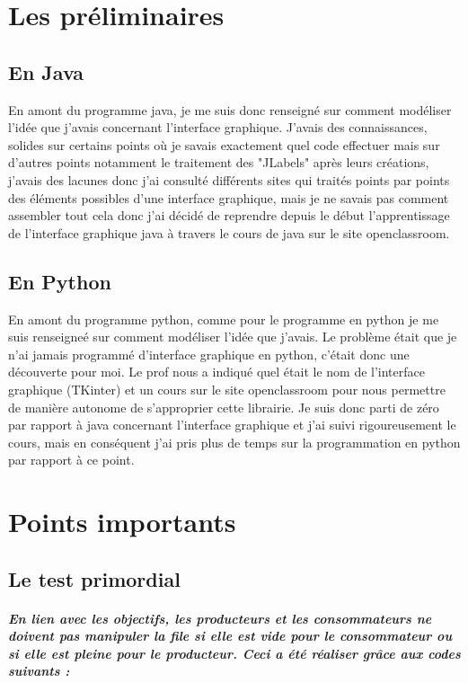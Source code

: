 \documentclass[a4paper]{report}
\begin{document}


\chapter{Les préliminaires}

\section{En Java}

En amont du programme java, je me suis donc renseigné sur comment modéliser l'idée que j'avais concernant l'interface graphique. J'avais des connaissances, solides sur certains points où je savais exactement quel code effectuer mais sur d'autres points notamment le traitement des "JLabels" après leurs créations, j'avais des lacunes donc j'ai consulté différents sites qui traités points par points des éléments possibles d'une interface graphique, mais je ne savais pas comment assembler tout cela donc j'ai décidé de reprendre depuis le début l'apprentissage de l'interface graphique java à travers le cours de java sur le site openclassroom.

\section{En Python}

En amont du programme python, comme pour le programme en python je me suis renseigneé sur comment modéliser l'idée que j'avais. Le problème était que je n'ai jamais programmé d'interface graphique en python, c'était donc une découverte pour moi. Le prof nous a indiqué quel était le nom de l'interface graphique (TKinter) et un cours sur le site openclassroom pour nous permettre de manière autonome de s'approprier cette librairie. Je suis donc parti de zéro par rapport à java concernant l'interface graphique et j'ai suivi rigoureusement le cours, mais en conséquent j'ai pris plus de temps sur la programmation en python par rapport à ce point.



\chapter{Points importants}

\section{Le test primordial}
\paragraph{
En lien avec les objectifs, les producteurs et les consommateurs ne doivent pas manipuler la file si elle est vide pour le consommateur ou si elle est pleine pour le producteur. Ceci a été réaliser grâce aux codes suivants :}
\end{document}
